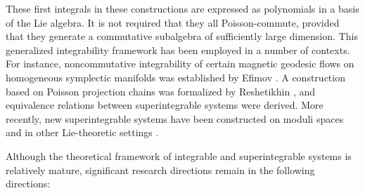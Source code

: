 \documentclass[11pt,reqno]{amsart}
\newtheorem*{theorem A}{Main Theorem A}
\newtheorem*{theorem B}{Main Theorem B}
\newtheorem*{theorem C}{Main Theorem C}
\newtheorem*{theorem D}{Main Theorem D}
\theoremstyle{definition}
\theoremstyle{plain}
\theoremstyle{conclusion}
\begin{document}

These first integrals in these constructions are expressed as polynomials in a basis of the Lie algebra. It is not required that they all Poisson-commute, provided that they generate a commutative subalgebra of sufficiently large dimension. This generalized integrability framework has been employed in a number of contexts. For instance, noncommutative integrability of certain magnetic geodesic flows on homogeneous symplectic manifolds was established by Efimov \cite{MR2141306}. A construction based on Poisson projection chains was formalized by Reshetikhin \cite{MR3493688}, and equivalence relations between superintegrable systems were derived. More recently, new superintegrable systems have been constructed on moduli spaces and in other Lie-theoretic settings \cite{MR4299124}.  

Although the theoretical framework of integrable and superintegrable systems is relatively mature, significant research directions remain in the following directions:
\end{document}
